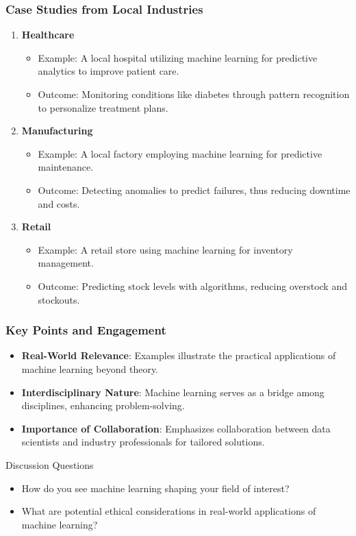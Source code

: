 \documentclass[aspectratio=169]{beamer}
\begin{document}
\begin{frame}[fragile]
    \frametitle{Case Studies from Local Industries}
    \begin{enumerate}
        \item \textbf{Healthcare}
            \begin{itemize}
                \item Example: A local hospital utilizing machine learning for predictive analytics to improve patient care.
                \item Outcome: Monitoring conditions like diabetes through pattern recognition to personalize treatment plans.
            \end{itemize}
        
        \item \textbf{Manufacturing}
            \begin{itemize}
                \item Example: A local factory employing machine learning for predictive maintenance.
                \item Outcome: Detecting anomalies to predict failures, thus reducing downtime and costs.
            \end{itemize}

        \item \textbf{Retail}
            \begin{itemize}
                \item Example: A retail store using machine learning for inventory management.
                \item Outcome: Predicting stock levels with algorithms, reducing overstock and stockouts.
            \end{itemize}
    \end{enumerate}
\end{frame}

\begin{frame}[fragile]
    \frametitle{Key Points and Engagement}
    \begin{itemize}
        \item \textbf{Real-World Relevance}: Examples illustrate the practical applications of machine learning beyond theory.
        \item \textbf{Interdisciplinary Nature}: Machine learning serves as a bridge among disciplines, enhancing problem-solving.
        \item \textbf{Importance of Collaboration}: Emphasizes collaboration between data scientists and industry professionals for tailored solutions.
    \end{itemize}

    \begin{block}{Discussion Questions}
        \begin{itemize}
            \item How do you see machine learning shaping your field of interest?
            \item What are potential ethical considerations in real-world applications of machine learning?
        \end{itemize}
    \end{block}
\end{frame}
\end{document}
